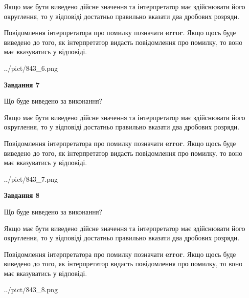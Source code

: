 \documentclass[12pt, ukrainian]{article}
\begin{document}
{\begin {Large}
Якщо має бути виведено дійсне значення та інтерпретатор має здійснювати його округлення, 
то у відповіді достатньо правильно вказати два дробових розряди.

Повідомлення інтерпретатора про помилку позначати \textbf{error}.
Якщо щось буде виведено до того, як інтерпретатор видасть повідомлення про помилку, 
то воно має вказуватись у відповіді. \par

\begin{center}
	{../pict/843_6.png}
\end{center}
\newpage

{\begin {center}\textbf{Завдання 7}\end {center}}\par
Що буде виведено за виконання? \par

Якщо має бути виведено дійсне значення та інтерпретатор має здійснювати його округлення, 
то у відповіді достатньо правильно вказати два дробових розряди.

Повідомлення інтерпретатора про помилку позначати \textbf{error}.
Якщо щось буде виведено до того, як інтерпретатор видасть повідомлення про помилку, 
то воно має вказуватись у відповіді. \par

\begin{center}
	{../pict/843_7.png}
\end{center}
\newpage

{\begin {center}\textbf{Завдання 8}\end {center}}\par
Що буде виведено за виконання? \par

Якщо має бути виведено дійсне значення та інтерпретатор має здійснювати його округлення, 
то у відповіді достатньо правильно вказати два дробових розряди.

Повідомлення інтерпретатора про помилку позначати \textbf{error}.
Якщо щось буде виведено до того, як інтерпретатор видасть повідомлення про помилку, 
то воно має вказуватись у відповіді. \par

\begin{center}
	{../pict/843_8.png}
\end{center}
\newpage


\end{Large}}
\end{document}

